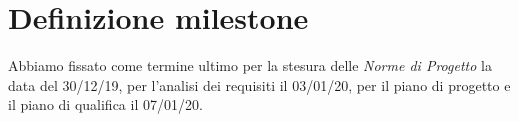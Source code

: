 \documentclass{article}
\begin{document}
\section{Definizione milestone}
\label{sec:definizione_milestone}
Abbiamo fissato come termine ultimo per la stesura delle \textit{Norme di Progetto} la data del 30/12/19, per l'analisi dei requisiti il 03/01/20, per il piano di progetto e il piano di qualifica il 07/01/20.
\end{document}
